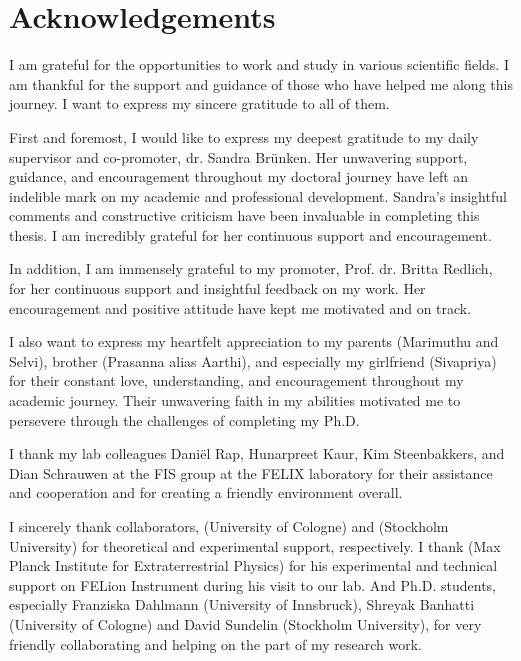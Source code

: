 \chapter{Acknowledgements}
\label{acknowledgements}

I am grateful for the opportunities to work and study in various scientific fields. I am thankful for the support and guidance of those who have helped me along this journey. I want to express my sincere gratitude to all of them.

First and foremost, I would like to express my deepest gratitude to my daily supervisor and co-promoter, dr. Sandra Br\"{u}nken. Her unwavering support, guidance, and encouragement throughout my doctoral journey have left an indelible mark on my academic and professional development. 
Sandra's insightful comments and constructive criticism have been invaluable in completing this thesis. I am incredibly grateful for her continuous support and encouragement.

In addition, I am immensely grateful to my promoter, Prof. dr. Britta Redlich, for her continuous support and insightful feedback on my work. Her encouragement and positive attitude have kept me motivated and on track.

I also want to express my heartfelt appreciation to my parents (Marimuthu and Selvi), brother (Prasanna alias Aarthi), and especially my girlfriend (Sivapriya) for their constant love, understanding, and encouragement throughout my academic journey. Their unwavering faith in my abilities motivated me to persevere through the challenges of completing my Ph.D.

I thank my lab colleagues Dani\"{e}l Rap, Hunarpreet Kaur, Kim Steenbakkers, and Dian Schrauwen at the FIS group at the FELIX laboratory for their assistance and cooperation and for creating a friendly environment overall.

I sincerely thank collaborators,  (University of Cologne) and  (Stockholm University) for theoretical and experimental support, respectively. I thank  (Max Planck Institute for Extraterrestrial Physics) for his experimental and technical support on FELion Instrument during his visit to our lab.  And Ph.D. students, especially Franziska Dahlmann (University of Innsbruck), Shreyak Banhatti (University of Cologne) and David Sundelin (Stockholm University), for very friendly collaborating and helping on the part of my research work.

